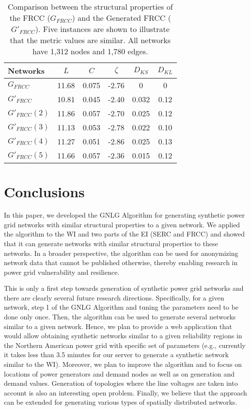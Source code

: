 \documentclass[10pt,journal]{IEEEtran}
\begin{document}
\begin{table}[t]
\centering
\vspace*{-.1cm}
\caption{Comparison between the structural properties of the FRCC ($G_{FRCC}$) and the Generated FRCC ($G'_{FRCC}$). Five instances are shown to illustrate that the metric values are similar. All networks have 1,312 nodes and 1,780 edges.}
\vspace*{-0.2cm}
\footnotesize
\begin{tabular}{|l|c|c|c|c|c|}
\hline
Networks& $L$&$C$& $\zeta$ & $D_{KS}$& $D_{KL}$\\
\hline
$G_{FRCC}$ & 11.68 &0.075 & -2.76 & 0&0\\
\hline
$G'_{FRCC}$ & 10.81 & 0.045 & -2.40&0.032 & 0.12\\
\hline
$G'_{FRCC} (2)$ & 11.86 & 0.057 & -2.70 &0.025& 0.12\\
\hline
$G'_{FRCC} (3)$ & 11.13 & 0.053 & -2.78 &0.022& 0.10\\
\hline
$G'_{FRCC} (4)$ & 11.27 & 0.051 & -2.86 &0.025& 0.13\\
\hline
$G'_{FRCC} (5)$ & 11.66 & 0.057 & -2.36 &0.015& 0.12\\
\hline
\end{tabular}
\label{tb:summary_FRCC}
\end{table}
\normalsize
\section{Conclusions}\label{sec:conclusion}

In this paper, we developed the GNLG Algorithm for generating synthetic power grid networks with similar structural properties to a given network. We applied the algorithm to the WI and two parts of the EI (SERC and FRCC) and showed that it can generate networks with similar structural properties to these networks. In a broader perspective, the algorithm can be used for anonymizing network data that cannot be published otherwise, thereby enabling research in power grid vulnerability and resilience.


This is only a first step towards generation of synthetic power grid networks and there are clearly several future research directions. Specifically, for a given network, step 1 of the GNLG Algorithm and tuning the parameters need to be done only once. Then, the algorithm can be used to generate several networks similar to a given network.
Hence, we plan to provide a web application that would allow obtaining synthetic networks similar to a given reliability regions in the Northern American power grid with specific set of parameters (e.g., currently it takes less than 3.5 minutes for our server to generate a synthetic network similar to the WI). Moreover, we plan to improve the algorithm and to focus on locations of power generators and demand nodes as well as on generation and demand values. Generation of topologies where the line voltages are taken into account is also an interesting open problem.
Finally, we believe that the approach can be extended for generating various types of spatially distributed networks.
\end{document}

